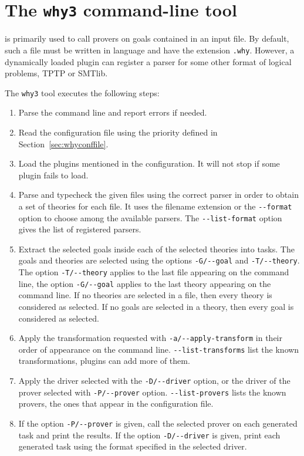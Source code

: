 \section{The \texttt{why3} command-line tool}
\label{sec:why3ref}

\why is primarily used to call provers on goals contained in an
input file. By default, such a file must be written in \why language
and have the extension \texttt{.why}. However, a dynamically loaded
plugin can register a parser for some other format of logical problems,
\eg{} TPTP or SMTlib.

The \texttt{why3} tool executes the following steps:
\begin{enumerate}
\item Parse the command line and report errors if needed.
\item Read the configuration file using the priority defined in
  Section~\ref{sec:whyconffile}.
\item Load the plugins mentioned in the configuration. It will not
  stop if some plugin fails to load.
\item Parse and typecheck the given files using the correct parser in order
  to obtain a set of \why theories for each file. It uses
  the filename extension or the \verb|--format| option to choose
  among the available parsers. The \verb|--list-format| option gives
  the list of registered parsers.
\item Extract the selected goals inside each of the selected theories
  into tasks. The goals and theories are selected using the options
  \verb|-G/--goal| and \verb|-T/--theory|. The option
  \verb|-T/--theory| applies to the last file appearing on the
  command line, the option \verb|-G/--goal| applies to the last theory
  appearing on the command line. If no theories are selected in a file,
  then every theory is considered as selected. If no goals are selected
  in a theory, then every goal is considered as selected.
\item Apply the transformation requested
  with \verb|-a/--apply-transform| in their order of appearance on the
  command line. \verb|--list-transforms| list the known
  transformations, plugins can add more of them.
\item Apply the driver selected with the \verb|-D/--driver| option,
  or the driver of the prover selected with \verb|-P/--prover|
  option. \verb|--list-provers| lists the known provers, \ie the ones
  that appear in the configuration file.
\item If the option \verb|-P/--prover| is given, call the selected prover
  on each generated task and print the results. If the option
  \verb|-D/--driver| is given, print each generated task using
  the format specified in the selected driver.
\end{enumerate}

